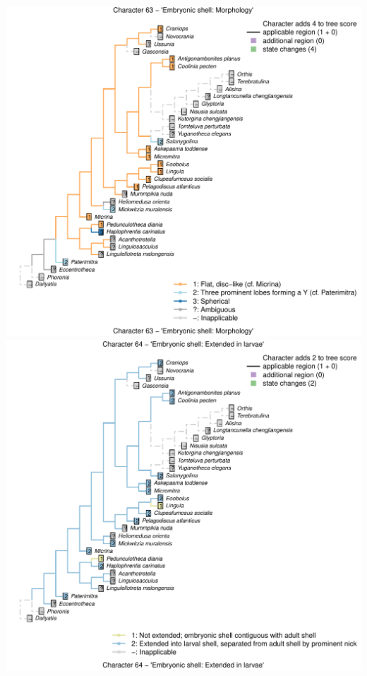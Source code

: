 \documentclass[]{book}
\theoremstyle{definition}
\theoremstyle{definition}
\theoremstyle{definition}
\theoremstyle{remark}
\begin{document}
\includegraphics{Brachiopod_phylogeny_files/figure-latex/unnamed-chunk-4-63.pdf}
\includegraphics{Brachiopod_phylogeny_files/figure-latex/unnamed-chunk-4-64.pdf}
\end{document}
